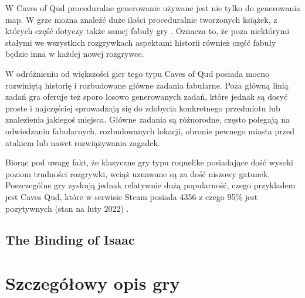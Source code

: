 \documentclass[12pt,twoside]{article}
\begin{document}
W Caves of Qud proceduralne generowanie używane jest nie tylko do generowania map. W grze można znaleźć duże ilości proceduralnie tworzonych książek, z których część dotyczy także samej fabuły gry \cite{coq_history}. Oznacza to, że poza niektórymi stałymi we wszystkich rozgrywkach aspektami historii również część fabuły będzie inna w każdej nowej rozgrywce.

W odróżnieniu od większości gier tego typu Caves of Qud posiada mocno rozwiniętą historię i rozbudowane główne zadania fabularne. Poza główną linią zadań gra oferuje też sporo losowo generowanych zadań, które jednak są dosyć proste i najczęściej sprowadzają się do zdobycia konkretnego przedmiotu lub znalezienia jakiegoś miejsca. Główne zadania są różnorodne, często polegają na odwiedzaniu fabularnych, rozbudowanych lokacji, obronie pewnego miasta przed atakiem lub nawet rozwiązywania zagadek.

Biorąc pod uwagę fakt, że klasyczne gry typu roquelike posiadające dość wysoki poziom trudności rozgrywki, wciąż uznawane są za dość niszowy gatunek. Poszczególne gry zyskują jednak relatywnie dużą popularność, czego przykladem jest Caves Qud, które w serwisie Steam posiada 4356 z czego 95\% jest pozytywnych (stan na luty 2022) \cite{coq_steam}.


\subsection{The Binding of Isaac}

\clearpage	


\section{Szczegółowy opis gry}
\end{document}
